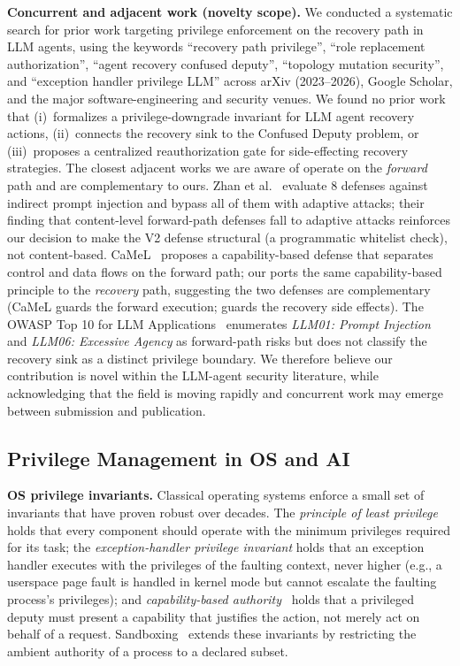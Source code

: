 \textbf{Concurrent and adjacent work (novelty scope).} We conducted a systematic search for prior work targeting privilege enforcement on the recovery path in LLM agents, using the keywords ``recovery path privilege'', ``role replacement authorization'', ``agent recovery confused deputy'', ``topology mutation security'', and ``exception handler privilege LLM'' across arXiv (2023--2026), Google Scholar, and the major software-engineering and security venues. We found no prior work that (i)~formalizes a privilege-downgrade invariant for LLM agent recovery actions, (ii)~connects the recovery sink to the Confused Deputy problem, or (iii)~proposes a centralized reauthorization gate for side-effecting recovery strategies. The closest adjacent works we are aware of operate on the \emph{forward} path and are complementary to ours. Zhan et al.~\cite{zhan2025adaptive} evaluate 8 defenses against indirect prompt injection and bypass all of them with adaptive attacks; their finding that content-level forward-path defenses fall to adaptive attacks reinforces our decision to make the V2 defense structural (a programmatic whitelist check), not content-based. CaMeL~\cite{debenedetti2025camel} proposes a capability-based defense that separates control and data flows on the forward path; our \reauthgate{} ports the same capability-based principle to the \emph{recovery} path, suggesting the two defenses are complementary (CaMeL guards the forward execution; \reauthgate{} guards the recovery side effects). The OWASP Top 10 for LLM Applications~\cite{owasp-llm-top10} enumerates \emph{LLM01: Prompt Injection} and \emph{LLM06: Excessive Agency} as forward-path risks but does not classify the recovery sink as a distinct privilege boundary. We therefore believe our contribution is novel within the LLM-agent security literature, while acknowledging that the field is moving rapidly and concurrent work may emerge between submission and publication.

\subsection{Privilege Management in OS and AI}
\label{sec:related-privilege}

\textbf{OS privilege invariants.} Classical operating systems enforce a small set of invariants that have proven robust over decades. The \emph{principle of least privilege}~\cite{saltzer1975protection} holds that every component should operate with the minimum privileges required for its task; the \emph{exception-handler privilege invariant} holds that an exception handler executes with the privileges of the faulting context, never higher (e.g., a userspace page fault is handled in kernel mode but cannot escalate the faulting process's privileges); and \emph{capability-based authority}~\cite{capabilities} holds that a privileged deputy must present a capability that justifies the action, not merely act on behalf of a request. Sandboxing~\cite{capsules,seccomp} extends these invariants by restricting the ambient authority of a process to a declared subset.

